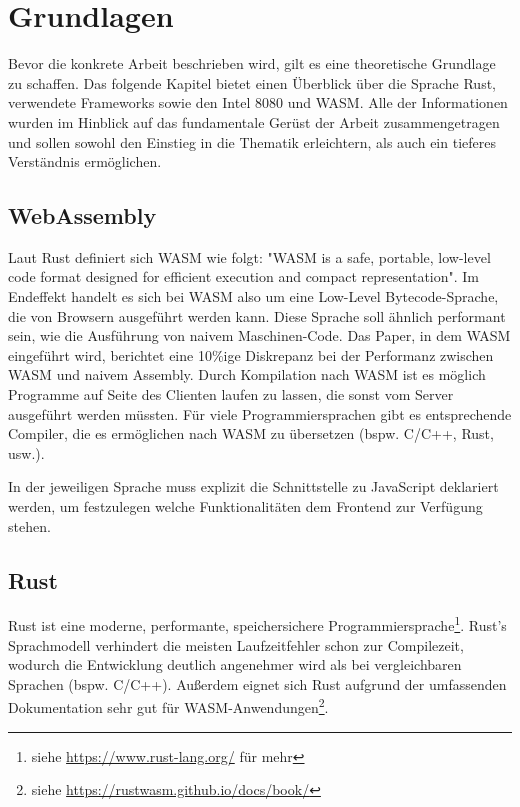 \chapter{Grundlagen}\label{chap:prereqs}

Bevor die konkrete Arbeit beschrieben wird, gilt es eine theoretische Grundlage zu schaffen. Das folgende Kapitel bietet einen Überblick über die Sprache Rust, verwendete Frameworks sowie den Intel 8080 und \ac{WASM}. Alle der Informationen wurden im Hinblick auf das fundamentale Gerüst der Arbeit zusammengetragen und sollen sowohl den Einstieg in die Thematik erleichtern, als auch ein tieferes Verständnis ermöglichen.

\section{WebAssembly}

Laut Rust definiert sich \ac{WASM} wie folgt: "\ac{WASM} is a safe, portable, low-level code format designed for efficient execution and compact representation"\cite{WebAssemblyCoreSpecification}. Im Endeffekt handelt es sich bei \ac{WASM} also um eine Low-Level Bytecode-Sprache, die von Browsern ausgeführt werden kann. Diese Sprache soll ähnlich performant sein, wie die Ausführung von naivem Maschinen-Code. Das Paper, in dem \ac{WASM} eingeführt wird, berichtet eine 10\%ige Diskrepanz bei der Performanz zwischen \ac{WASM} und naivem Assembly\cite{10.1145/3062341.3062363}. Durch Kompilation nach \ac{WASM} ist es möglich Programme auf Seite des Clienten laufen zu lassen, die sonst vom Server ausgeführt werden müssten.
Für viele Programmiersprachen gibt es entsprechende Compiler, die es ermöglichen nach \ac{WASM} zu übersetzen (bspw. C/C++, Rust, usw.).

In der jeweiligen Sprache muss explizit die Schnittstelle zu JavaScript deklariert werden, um festzulegen welche Funktionalitäten dem Frontend zur Verfügung stehen.

\section{Rust}

Rust ist eine moderne, performante, speichersichere Programmiersprache\footnote{siehe \url{https://www.rust-lang.org/} für mehr}. Rust's Sprachmodell verhindert die meisten Laufzeitfehler schon zur Compilezeit, wodurch die Entwicklung deutlich angenehmer wird als bei vergleichbaren Sprachen (bspw. C/C++). Außerdem eignet sich Rust aufgrund der umfassenden Dokumentation sehr gut für \ac{WASM}-Anwendungen\footnote{siehe \url{https://rustwasm.github.io/docs/book/}}.

